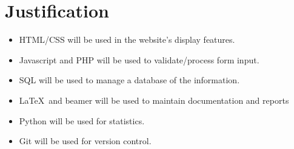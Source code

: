 \documentclass{article}
\begin{document}
\section{Justification}
\begin{itemize}
    \item HTML/CSS will be used in the website's display features.
    \item Javascript and PHP will be used to validate/process form input.
    \item SQL will be used to manage a database of the information.
    \item \LaTeX~and beamer will be used to maintain documentation and reports
    \item Python will be used for statistics.
    \item Git will be used for version control.
\end{itemize}
\end{document}
